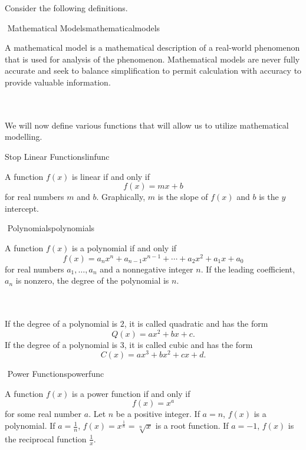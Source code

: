 		Consider the following definitions.
		\begin{definition}{\Stop\,\,Mathematical Models}{mathematicalmodels}
			
			A mathematical model is a mathematical description of a real-world phenomenon that is used for analysis of the phenomenon. Mathematical models are never fully accurate and seek to balance simplification to permit calculation with accuracy to provide valuable information.

		\end{definition}
		\vphantom
		\\
		\\
		We will now define various functions that will allow us to utilize mathematical modelling.
		\begin{definition}{Stop\,\,Linear Functions}{linfunc}
			
			A function \(f(x)\) is linear if and only if
			\begin{equation*}
				f(x)=mx+b
			\end{equation*}
			for real numbers \(m\) and \(b\). Graphically, \(m\) is the slope of \(f(x)\) and \(b\) is the \(y\) intercept.

		\end{definition}
		\begin{definition}{\Stop\,\,Polynomials}{polynomials}

			A function \(f(x)\) is a polynomial if and only if
			\begin{equation*}
				f(x)=a_nx^n+a_{n-1}x^{n-1}+\cdots+a_2x^2+a_1x+a_0
			\end{equation*}
			for real numbers \(a_1,\ldots,a_n\) and a nonnegative integer \(n\). If the leading coefficient, \(a_n\) is nonzero, the degree of the polynomial is \(n\).
			
		\end{definition}
		\vphantom
		\\
		\\
		If the degree of a polynomial is \(2\), it is called quadratic and has the form
		\begin{equation*}
			Q(x)=ax^2+bx+c.
		\end{equation*}
		If the degree of a polynomial is \(3\), it is called cubic and has the form
		\begin{equation*}
			C(x)=ax^3+bx^2+cx+d.
		\end{equation*}
		\begin{definition}{\Stop\,\,Power Functions}{powerfunc}

			A function \(f(x)\) is a power function if and only if
			\begin{equation*}
				f(x)=x^a
			\end{equation*}
			for some real number \(a\). Let \(n\) be a positive integer. If \(a=n\), \(f(x)\) is a polynomial. If \(a=\frac{1}{n}\), \(f(x)=x^\frac{1}{n}=\sqrt[n]{x}\) is a root function. If \(a=-1\), \(f(x)\) is the reciprocal function \(\frac{1}{x}\).
			
		\end{definition}
